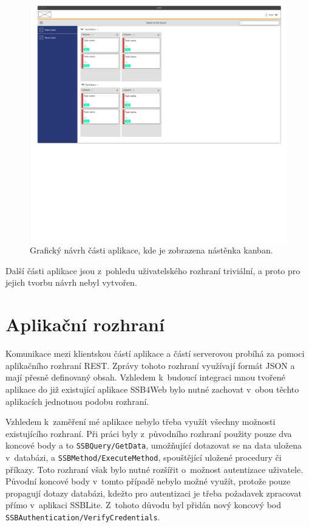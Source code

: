 \begin{figure}[H]
	\centering
	\label{img:design-kanban}
	\includegraphics[width=\textwidth]{obrazky-figures/ui-design.pdf}
	\caption{Grafický návrh části aplikace, kde je zobrazena nástěnka kanban.}
\end{figure}

Další části aplikace jsou z~pohledu uživatelského rozhraní triviální, a proto pro jejich tvorbu návrh nebyl vytvořen.


\section{Aplikační rozhraní}\label{sec:api}
Komunikace mezi klientskou částí aplikace a částí serverovou probíhá za pomoci aplikačního rozhraní REST. Zprávy tohoto rozhraní využívají formát JSON a mají přesně definovaný obsah.
Vzhledem k~budoucí integraci mnou tvořené aplikace do již existující aplikace SSB4Web bylo nutné zachovat v~obou těchto aplikacích jednotnou podobu rozhraní.

Vzhledem k~zaměření mé aplikace nebylo třeba využít všechny možnosti existujícího rozhraní. Při práci byly z~původního rozhraní použity pouze dva koncové body a to \texttt{SSBQuery/GetData}, umožňující dotazovat se na data uložena v~databázi, a \sloppy\texttt{SSBMethod/ExecuteMethod}, spouštějící uložené procedury či příkazy. Toto rozhraní však bylo nutné rozšířit o~možnost autentizace uživatele. Původní koncové body v~tomto případě nebylo možné využít, protože pouze propagují dotazy databázi, kdežto pro autentizaci je třeba požadavek zpracovat přímo v~aplikaci SSBLite. Z~tohoto důvodu byl přidán nový koncový bod \sloppy\texttt{SSBAuthentication/VerifyCredentials}.


